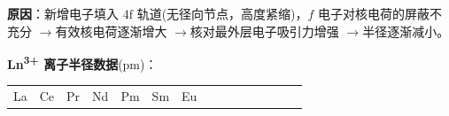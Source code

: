 \documentclass[a4paper,11pt]{ctexart}
\newcounter{none}
\newcommand{\箭}{\ensuremath{\rightarrow}}
\newcommand{\左箭}{\ensuremath{\leftarrow}}
\newcommand{\上箭}{\ensuremath{\uparrow}}
\newcommand{\下箭}{\ensuremath{\downarrow}}
\newcommand{\衡}{\ensuremath{\rightleftharpoons}}
\newcommand{\双箭}{\ensuremath{\leftrightarrow}}
\newcommand{\约等于}{\ensuremath{\approx}}
\newcommand{\小于等于}{\ensuremath{\leq}}
\newcommand{\大于等于}{\ensuremath{\geq}}
\newcommand{\不等于}{\ensuremath{\neq}}
\newcommand{\西格马}{\ensuremath{\sigma}}
\newcommand{\派}{\ensuremath{\pi}}
\begin{document}
\textbf{原因}：新增电子填入 \(4\mathrm{f}\) 轨道(无径向节点，高度紧缩)，\(f\) 电子对核电荷的屏蔽不充分 \箭 有效核电荷逐渐增大 \箭 核对最外层电子吸引力增强 \箭 半径逐渐减小。

\textbf{Ln\textsuperscript{3+} 离子半径数据}(pm)：

{\def\LTcaptype{none} %
\begin{longtable}[]{@{}
  >{\centering\arraybackslash}p{}
  >{\centering\arraybackslash}p{}
  >{\centering\arraybackslash}p{}
  >{\centering\arraybackslash}p{}
  >{\centering\arraybackslash}p{}
  >{\centering\arraybackslash}p{}
  >{\centering\arraybackslash}p{}
  >{\centering\arraybackslash}p{}
  >{\centering\arraybackslash}p{}
  >{\centering\arraybackslash}p{}
  >{\centering\arraybackslash}p{}
  >{\centering\arraybackslash}p{}
  >{\centering\arraybackslash}p{}
  >{\centering\arraybackslash}p{}
  >{\centering\arraybackslash}p{}@{}}
\toprule\noalign{}
\begin{minipage}[b]{\linewidth}\centering
La
\end{minipage} & \begin{minipage}[b]{\linewidth}\centering
Ce
\end{minipage} & \begin{minipage}[b]{\linewidth}\centering
Pr
\end{minipage} & \begin{minipage}[b]{\linewidth}\centering
Nd
\end{minipage} & \begin{minipage}[b]{\linewidth}\centering
Pm
\end{minipage} & \begin{minipage}[b]{\linewidth}\centering
Sm
\end{minipage} & \begin{minipage}[b]{\linewidth}\centering
Eu
\end{minipage} & \begin{minipage}[b]{\linewidth}\centering

\end{minipage}
\end{longtable}}
\end{document}
